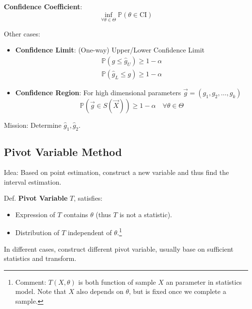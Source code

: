     \textbf{Confidence Coefficient}:
    \begin{equation}\inf_{\forall\theta\in\Theta}\mathbb{P}(
        \theta\in\mathrm{CI}
    )\end{equation}

    Other cases:
    \begin{itemize}[topsep=-4pt]
        \item \textbf{Confidence Limit}: (One-way) Upper/Lower Confidence Limit
    \begin{align}
        \mathbb{P}(g\leq \hat{g}_U)\geq 1-\alpha\\
        \mathbb{P}(\hat{g}_L\leq g)\geq 1-\alpha
    \end{align}
        \item \textbf{Confidence Region}: For high dimensional parameters $\vec{g}=(g_1,g_2,\ldots,g_k)$
        \begin{equation}\mathbb{P}(\vec{g}\in S(\vec{X}))\geq 1-\alpha\quad \forall \theta\in\Theta \end{equation}
        
    \end{itemize}

    Mission: Determine $\hat{g}_1,\hat{g}_2$.


\subsection{Pivot Variable Method}\label{SubSectionPivotVariableMethod}
    Idea: Based on point estimation, construct a new variable and thus find the interval estimation.

    Def. \textbf{Pivot Variable} $T$, satisfies: 
    \begin{itemize}[itemsep= -2 pt,parsep= -2 pt]
        \item Expression of $T$ contains $\theta$ (thus $T$ is not a statistic).
        \item Distribution of $T$ independent of $\theta$.\footnote{Comment: $ T(X,\theta ) $ is both function of sample $ X $ an parameter in statistics model. Note that $ X $ also depends on $ \theta  $, but is fixed once we complete a sample.}
    \end{itemize}

    In different cases, construct different pivot variable, usually base on sufficient statistics and transform.
    
